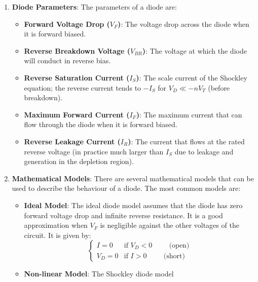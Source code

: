 \begin{enumerate}
\begin{itemize}
        sensitive electronics from electrostatic discharge (ESD) and
        other transient voltage events. Examples include the P6KE
        series (unidirectional/bidirectional, 600\,W) and the
        SMBJ series (surface-mount).
    \end{itemize}
  \item \textbf{Diode Parameters}:
    The parameters of a diode are:
    \begin{itemize}
      \item \textbf{Forward Voltage Drop (\(V_F\))}: The voltage drop
        across the diode when it is forward biased.
      \item \textbf{Reverse Breakdown Voltage (\(V_{BR}\))}: The voltage
        at which the diode will conduct in reverse bias.
      \item \textbf{Reverse Saturation Current (\(I_S\))}: The scale
        current of the Shockley equation; the reverse current tends to
        \(-I_S\) for \(V_D \ll -nV_T\) (before breakdown).
      \item \textbf{Maximum Forward Current (\(I_F\))}: The maximum
        current that can flow through the diode when it is forward biased.
      \item \textbf{Reverse Leakage Current (\(I_R\))}: The current
        that flows at the rated reverse voltage (in practice much larger
        than \(I_S\) due to leakage and generation in the depletion region).
    \end{itemize}
  \item \textbf{Mathematical Models}:
    There are several mathematical models that can be used to describe
    the behaviour of a diode. The most common models are:
    \begin{itemize}
      \item \textbf{Ideal Model}: The ideal diode model assumes
        that the diode has zero forward voltage drop and infinite reverse
        resistance. It is a good approximation when \(V_F\) is negligible
        against the other voltages of the circuit. It is given by:
        \[
          \begin{cases}
            I = 0 & \text{if } V_D < 0 \hspace{1cm} \text{(open)} \\
            V_D = 0 & \text{if } I > 0 \hspace{1cm} \text{(short)}
          \end{cases}
        \]
      \item \textbf{Non-linear Model}: The Shockley diode model

\end{itemize}
\end{enumerate}
